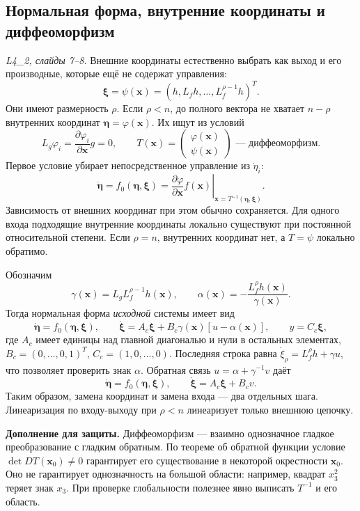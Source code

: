 \subsection{Нормальная форма, внутренние координаты и диффеоморфизм}

\textit{L4\_2, слайды 7--8.}
Внешние координаты естественно выбрать как выход и его производные,
которые ещё не содержат управления:
\[
 \bm\xi=\psi(\bm x)=
 (h,L_fh,\ldots,L_f^{\rho-1}h)^T.
\]
Они имеют размерность $\rho$. Если $\rho<n$, до полного вектора
не хватает $n-\rho$ внутренних координат
$\bm\eta=\varphi(\bm x)$. Их ищут из условий
\[
 L_g\varphi_i=\frac{\partial\varphi_i}{\partial\bm x}g=0,
 \qquad
 T(\bm x)=\begin{pmatrix}\varphi(\bm x)\\\psi(\bm x)\end{pmatrix}
 \text{ --- диффеоморфизм}.
\]
Первое условие убирает непосредственное управление из $\dot\eta_i$:
\[
 \dot{\bm\eta}=f_0(\bm\eta,\bm\xi)
 =\left.\frac{\partial\varphi}{\partial\bm x}f(\bm x)
 \right|_{\bm x=T^{-1}(\bm\eta,\bm\xi)}.
\]
Зависимость от внешних координат при этом обычно сохраняется.
Для одного входа подходящие внутренние координаты локально
существуют при постоянной относительной степени. Если $\rho=n$,
внутренних координат нет, а $T=\psi$ локально обратимо.

Обозначим
\[
 \gamma(\bm x)=L_gL_f^{\rho-1}h(\bm x),\qquad
 \alpha(\bm x)=-\frac{L_f^\rho h(\bm x)}{\gamma(\bm x)}.
\]
Тогда нормальная форма \emph{исходной} системы имеет вид
\[
 \dot{\bm\eta}=f_0(\bm\eta,\bm\xi),\qquad
 \dot{\bm\xi}=A_c\bm\xi+B_c\gamma(\bm x)[u-\alpha(\bm x)],
 \qquad y=C_c\bm\xi,
\]
где $A_c$ имеет единицы над главной диагональю и нули в остальных
элементах, $B_c=(0,\ldots,0,1)^T$, $C_c=(1,0,\ldots,0)$.
Последняя строка равна $\dot\xi_\rho=L_f^\rho h+\gamma u$,
что позволяет проверить знак $\alpha$.
Обратная связь $u=\alpha+\gamma^{-1}v$ даёт
\[
 \dot{\bm\eta}=f_0(\bm\eta,\bm\xi),\qquad
 \dot{\bm\xi}=A_c\bm\xi+B_cv.
\]
Таким образом, замена координат и замена входа --- два отдельных
шага. Линеаризация по входу-выходу при $\rho<n$ линеаризует только
внешнюю цепочку.

\textbf{Дополнение для защиты.} Диффеоморфизм --- взаимно однозначное
гладкое преобразование с гладким обратным. По теореме об обратной
функции условие $\det DT(\bm x_0)\ne0$ гарантирует его существование
в некоторой окрестности $\bm x_0$. Оно не гарантирует однозначность
на большой области: например, квадрат $x_3^2$ теряет знак $x_3$.
При проверке глобальности полезнее явно выписать $T^{-1}$ и его область.

